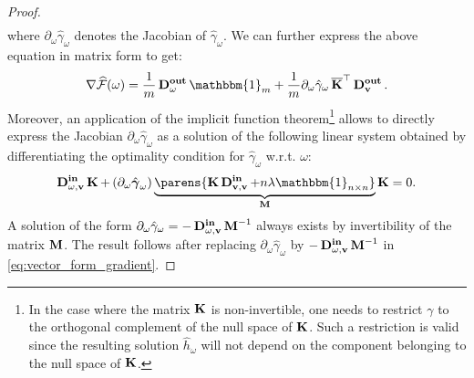 \begin{proof}
\begin{align*}
\end{align*}
where $\partial_{\omega}\hat{\gamma}_{\omega}$ denotes the Jacobian of $\hat{\gamma}_{\omega}$. We can further express the above equation in matrix form to get:
\begin{align}\label{eq:vector_form_gradient}
	\nabla \widehat{\mathcal{F}}(\omega) = \frac{1}{m}\Dthree\mathbbm{1}_m+\frac{1}{m}\partial_{\omega}\hat{\gamma}_{\omega} \Kbar^{\top}\Done.
\end{align}
	Moreover, an application of the  implicit function theorem\footnote{In the case where the matrix $\operatorname{\mathbf{K}}$ is non-invertible, one needs to restrict $\gamma$ to the orthogonal complement of the null space of $\operatorname{\mathbf{K}}$. Such a restriction is valid since the resulting solution $\hat{h}_{\omega}$ will not depend on the component belonging to the null space of $\operatorname{\mathbf{K}}$. } allows to directly express the Jacobian $\partial_{\omega}\hat{\gamma}_{\omega}$ as a solution of the following linear system obtained by differentiating the optimality condition  for $\hat{\gamma}_{\omega}$ w.r.t. $\omega$:
\begin{equation*}
    \Dfour\K+\left(\partial_\omega\hat{\gammabf}_\omega\right)\underbrace{\parens{\K\Dtwo+n\lambda\mathbbm{1}_{n\times n} }}_{\M}\K=0.
\end{equation*}
A solution of the form $\partial_{\omega}\hat{\gamma}_{\omega} = -  \operatorname{\mathbf{D_{\omega,v}^{in}}}\operatorname{\mathbf{M}}^{-1}$ always exists by invertibility of the matrix $\operatorname{\mathbf{M}}$. The result follows after replacing $\partial_{\omega}\hat{\gamma}_{\omega}$ by $-\operatorname{\mathbf{D_{\omega,v}^{in}}}\operatorname{\mathbf{M}}^{-1}$ in \cref{eq:vector_form_gradient}. 
\end{proof}

